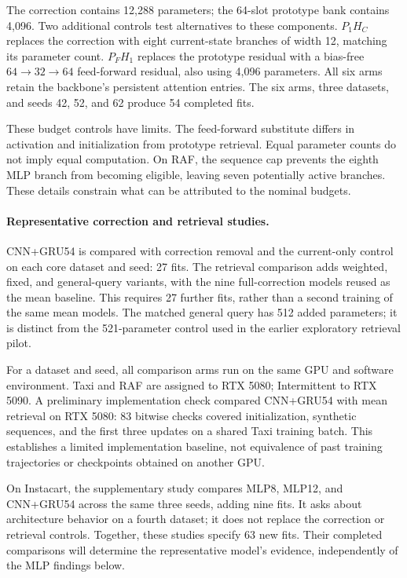 \documentclass[runningheads]{llncs}
\begin{document}
The correction contains 12,288 parameters; the 64-slot prototype bank contains 4,096. Two additional controls test alternatives to these components. $P_1H_C$ replaces the correction with eight current-state branches of width 12, matching its parameter count. $P_FH_1$ replaces the prototype residual with a bias-free $64\!\to\!32\!\to\!64$ feed-forward residual, also using 4,096 parameters. All six arms retain the backbone's persistent attention entries. The six arms, three datasets, and seeds 42, 52, and 62 produce 54 completed fits.

These budget controls have limits. The feed-forward substitute differs in activation and initialization from prototype retrieval. Equal parameter counts do not imply equal computation. On RAF, the sequence cap prevents the eighth MLP branch from becoming eligible, leaving seven potentially active branches. These details constrain what can be attributed to the nominal budgets.

\paragraph{Representative correction and retrieval studies.}
CNN+GRU54 is compared with correction removal and the current-only control on each core dataset and seed: 27 fits. The retrieval comparison adds weighted, fixed, and general-query variants, with the nine full-correction models reused as the mean baseline. This requires 27 further fits, rather than a second training of the same mean models. The matched general query has 512 added parameters; it is distinct from the 521-parameter control used in the earlier exploratory retrieval pilot.

For a dataset and seed, all comparison arms run on the same GPU and software environment. Taxi and RAF are assigned to RTX 5080; Intermittent to RTX 5090. A preliminary implementation check compared CNN+GRU54 with mean retrieval on RTX 5080: 83 bitwise checks covered initialization, synthetic sequences, and the first three updates on a shared Taxi training batch. This establishes a limited implementation baseline, not equivalence of past training trajectories or checkpoints obtained on another GPU.

On Instacart, the supplementary study compares MLP8, MLP12, and CNN+GRU54 across the same three seeds, adding nine fits. It asks about architecture behavior on a fourth dataset; it does not replace the correction or retrieval controls. Together, these studies specify 63 new fits. Their completed comparisons will determine the representative model's evidence, independently of the MLP findings below.
\end{document}
